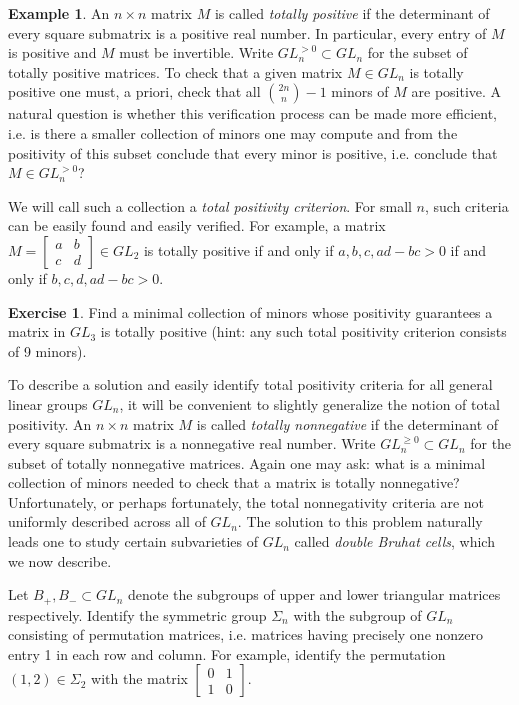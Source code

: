 \documentclass{amsart}
\theoremstyle{definition}
\newtheorem{example}[theorem]{Example}
\newtheorem{subexercise}{Exercise}[theorem]
\theoremstyle{remark}
\numberwithin{equation}{section}
\begin{document}
  \begin{example}\label{example:total positivity}
    An $n\times n$ matrix $M$ is called \emph{totally positive} if the determinant of every square submatrix is a positive real number.  In particular, every entry of $M$ is positive and $M$ must be invertible.  Write $GL_n^{>0}\subset GL_n$ for the subset of totally positive matrices.  To check that a given matrix $M\in GL_n$ is totally positive one must, a priori, check that all ${2n\choose n}-1$ minors of $M$ are positive.  A natural question is whether this verification process can be made more efficient, i.e. is there a smaller collection of minors one may compute and from the positivity of this subset conclude that every minor is positive, i.e. conclude that $M\in GL_n^{>0}$?

    We will call such a collection a \emph{total positivity criterion}.  For small $n$, such criteria can be easily found and easily verified.  For example, a matrix $M=\left[\begin{array}{cc} a & b\\ c & d\end{array}\right]\in GL_2$ is totally positive if and only if $a,b,c,ad-bc>0$ if and only if $b,c,d,ad-bc>0$.
    \begin{subexercise}
      Find a minimal collection of minors whose positivity guarantees a matrix in $GL_3$ is totally positive (hint: any such total positivity criterion consists of 9 minors).
    \end{subexercise}

    To describe a solution and easily identify total positivity criteria for all general linear groups $GL_n$, it will be convenient to slightly generalize the notion of total positivity.  An $n\times n$ matrix $M$ is called \emph{totally nonnegative} if the determinant of every square submatrix is a nonnegative real number.  Write $GL_n^{\ge0}\subset GL_n$ for the subset of totally nonnegative matrices.  Again one may ask: what is a minimal collection of minors needed to check that a matrix is totally nonnegative?  Unfortunately, or perhaps fortunately, the total nonnegativity criteria are not uniformly described across all of $GL_n$.  The solution to this problem naturally leads one to study certain subvarieties of $GL_n$ called \emph{double Bruhat cells}, which we now describe.

    Let $B_+,B_-\subset GL_n$ denote the subgroups of upper and lower triangular matrices respectively.  Identify the symmetric group $\Sigma_n$ with the subgroup of $GL_n$ consisting of permutation matrices, i.e. matrices having precisely one nonzero entry 1 in each row and column.  For example, identify the permutation $(1,2)\in\Sigma_2$ with the matrix $\left[\begin{array}{cc}0 & 1\\ 1 & 0\end{array}\right]$.  


\end{example}
\end{document}

